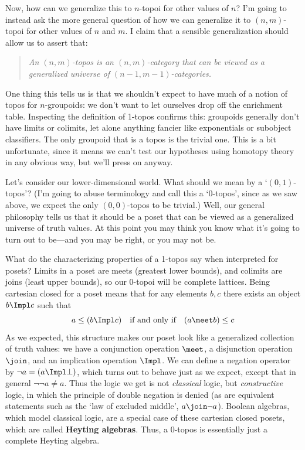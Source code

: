 \documentclass[12pt]{amsart}
\begin{document}
Now, how can we generalize this to $n$-topoi for other values of $n$?
I'm going to instead ask the more general question of how we can
generalize it to $(n,m)$-topoi for other values of $n$ and $m$.  I
claim that a sensible generalization should allow us to assert that:

\begin{quote}
  \emph{An $(n,m)$-topos is an $(n,m)$-category that can be viewed as
    a generalized universe of $(n-1,m-1)$-categories.}
\end{quote}

One thing this tells us is that we shouldn't expect to have much of a
notion of topos for $n$-groupoids: we don't want to let ourselves drop
off the enrichment table.  Inspecting the definition of 1-topos
confirms this: groupoids generally don't have limits or colimits, let
alone anything fancier like exponentials or subobject classifiers.
The only groupoid that is a topos is the trivial one.  This is a bit
unfortunate, since it means we can't test our hypotheses using
homotopy theory in any obvious way, but we'll press on anyway.

Let's consider our lower-dimensional world.  What should we mean by a
`$(0,1)$-topos'?  (I'm going to abuse terminology and call this a
`0-topos', since as we saw above, we expect the only $(0,0)$-topos to
be trivial.)  Well, our general philosophy tells us that it should be
a poset that can be viewed as a generalized universe of truth values.
At this point you may think you know what it's going to turn out to
be---and you may be right, or you may not be.

What do the characterizing properties of a 1-topos say when
interpreted for posets?  Limits in a poset are meets (greatest lower
bounds), and colimits are joins (least upper bounds), so our 0-topoi
will be complete lattices.  Being cartesian closed for a poset means
that for any elements $b,c$ there exists an object  $b\Impl c$ such
that
\[
a \le (b\Impl c) \quad\text{if and only if}\quad (a\meet b) \le c
\]
As we expected, this structure makes our poset look like a generalized
collection of truth values: we have a conjunction operation $\meet$, a
disjunction operation $\join$, and an implication operation $\Impl$.
We can define a negation operator by $\neg a = (a \Impl \bot)$, which
turns out to behave just as we expect, except that in general
$\neg\neg a \neq a$.  Thus the logic we get is not \emph{classical}
logic, but \emph{constructive} logic, in which the principle of double
negation is denied (as are equivalent statements such as the `law of
excluded middle', $a\join \neg a$).  Boolean algebras, which model
classical logic, are a special case of these cartesian closed posets,
which are called \textbf{Heyting algebras}.  Thus, a 0-topos is
essentially just a complete Heyting algebra.
\end{document}
